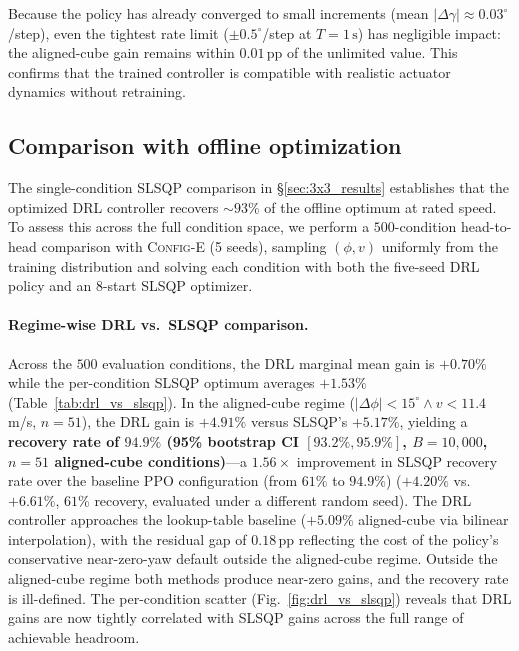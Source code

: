 \documentclass[final,5p,times]{elsarticle}
\begin{document}
Because the policy has already converged to small increments (mean $|\Delta\gamma|\!\approx\!0.03^\circ$/step), even the tightest rate limit ($\pm0.5^\circ$/step at $T\!=\!1\,\mathrm{s}$) has negligible impact: the aligned-cube gain remains within $0.01$\,pp of the unlimited value. This confirms that the trained controller is compatible with realistic actuator dynamics without retraining.

\subsection{Comparison with offline optimization}\label{sec:drl_vs_slsqp}
The single-condition SLSQP comparison in \S\ref{sec:3x3_results} establishes that the optimized DRL controller recovers ${\sim}93\%$ of the offline optimum at rated speed. To assess this across the full condition space, we perform a $500$-condition head-to-head comparison with \textsc{Config-E} (5 seeds), sampling $(\phi,v)$ uniformly from the training distribution and solving each condition with both the five-seed DRL policy and an $8$-start SLSQP optimizer.

\paragraph{Regime-wise DRL vs.\ SLSQP comparison.}
Across the $500$ evaluation conditions, the DRL marginal mean gain is $+0.70\%$ while the per-condition SLSQP optimum averages $+1.53\%$ (Table~\ref{tab:drl_vs_slsqp}). In the aligned-cube regime ($|\Delta\phi|<15^\circ \wedge v<11.4$\,m/s, $n{=}51$), the DRL gain is $\mathbf{+4.91\%}$ versus SLSQP's $+5.17\%$, yielding a \textbf{recovery rate of $94.9\%$ (95\% bootstrap CI $[93.2\%, 95.9\%]$, $B{=}10{,}000$, $n{=}51$ aligned-cube conditions)}---a $1.56{\times}$ improvement in SLSQP recovery rate over the baseline PPO configuration (from $61\%$ to $94.9\%$) ($+4.20\%$ vs.\ $+6.61\%$, $61\%$ recovery, evaluated under a different random seed). The DRL controller approaches the lookup-table baseline ($+5.09\%$ aligned-cube via bilinear interpolation), with the residual gap of $0.18$\,pp reflecting the cost of the policy's conservative near-zero-yaw default outside the aligned-cube regime. Outside the aligned-cube regime both methods produce near-zero gains, and the recovery rate is ill-defined. The per-condition scatter (Fig.~\ref{fig:drl_vs_slsqp}) reveals that DRL gains are now tightly correlated with SLSQP gains across the full range of achievable headroom.
\end{document}
